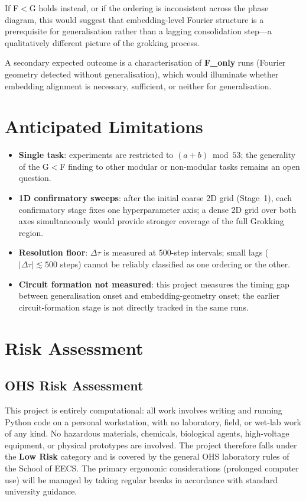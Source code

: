 \documentclass[12pt,openany,a4paper]{book}
\newcommand{\Dtau}{\Delta\tau}
\begin{document}
If F$<$G holds instead, or if the ordering is inconsistent across the
phase diagram, this would suggest that embedding-level Fourier structure
is a prerequisite for generalisation rather than a lagging consolidation
step---a qualitatively different picture of the grokking process.

A secondary expected outcome is a characterisation of \textbf{F\_only}
runs (Fourier geometry detected without generalisation), which would
illuminate whether embedding alignment is necessary, sufficient, or
neither for generalisation.

\section{Anticipated Limitations}

\begin{itemize}
  \item \textbf{Single task}: experiments are restricted to
    $(a+b)\bmod 53$; the generality of the G$<$F finding to other
    modular or non-modular tasks remains an open question.
  \item \textbf{1D confirmatory sweeps}: after the initial coarse 2D
    grid (Stage~1), each confirmatory stage fixes one hyperparameter
    axis; a dense 2D grid over both axes simultaneously would provide
    stronger coverage of the full Grokking region.
  \item \textbf{Resolution floor}: $\Dtau$ is measured at 500-step
    intervals; small lags ($|\Dtau|\lesssim500$ steps) cannot be
    reliably classified as one ordering or the other.
  \item \textbf{Circuit formation not measured}: this project measures
    the timing gap between generalisation onset and embedding-geometry
    onset; the earlier circuit-formation stage is not directly tracked
    in the same runs.
\end{itemize}

\section{Risk Assessment}

\subsection{OHS Risk Assessment}

This project is entirely computational: all work involves writing and
running Python code on a personal workstation, with no laboratory,
field, or wet-lab work of any kind.
No hazardous materials, chemicals, biological agents, high-voltage
equipment, or physical prototypes are involved.
The project therefore falls under the \textbf{Low Risk} category
and is covered by the general OHS laboratory rules of the School
of EECS.
The primary ergonomic considerations (prolonged computer use) will be
managed by taking regular breaks in accordance with standard university
guidance.
\end{document}
